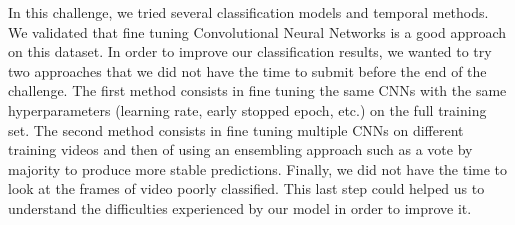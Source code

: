 \documentclass[10pt,twocolumn,letterpaper]{article}
\begin{document}
In this challenge, we tried several classification models and temporal methods. We validated that fine tuning Convolutional Neural Networks is a good approach on this dataset. In order to improve our classification results, we wanted to try two approaches that we did not have the time to submit before the end of the challenge. The first method consists in fine tuning the same CNNs with the same hyperparameters (learning rate, early stopped epoch, etc.) on the full training set. The second method consists in fine tuning multiple CNNs on different training videos and then of using an ensembling approach such as a vote by majority to produce more stable predictions. Finally, we did not have the time to look at the frames of video poorly classified. This last step could helped us to understand the difficulties experienced by our model in order to improve it.







{\small


}
\end{document}
